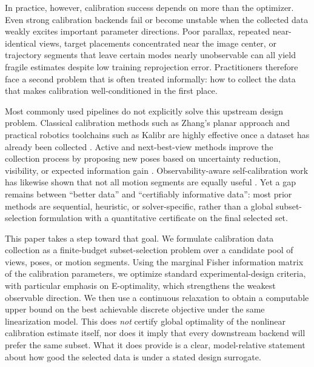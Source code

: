 \documentclass[11pt]{article}
\begin{document}
In practice, however, calibration success depends on more than the optimizer.
Even strong calibration backends fail or become unstable when the collected data
weakly excites important parameter directions. Poor parallax, repeated
near-identical views, target placements concentrated near the image center, or
trajectory segments that leave certain modes nearly unobservable can all yield
fragile estimates despite low training reprojection error. Practitioners
therefore face a second problem that is often treated informally: how to collect
the data that makes calibration well-conditioned in the first place.

Most commonly used pipelines do not explicitly solve this upstream design
problem. Classical calibration methods such as Zhang's planar approach and
practical robotics toolchains such as Kalibr are highly effective once a
dataset has already been collected
\citep{zhang2000flexible,furgale2013kalibr,kalibr_toolbox}. Active and
next-best-view methods improve the collection process by proposing new poses
based on uncertainty reduction, visibility, or expected information gain
\citep{richardson2013aprilcal,peng2019calibration,rojtberg2018efficient,yang2023nbv,wang2025active}.
Observability-aware self-calibration work has likewise shown that not all motion
segments are equally useful
\citep{maye2013self,schneider2017informative,schneider2019observability,yang2023online}.
Yet a gap remains between ``better data'' and ``certifiably informative data'':
most prior methods are sequential, heuristic, or solver-specific, rather than a
global subset-selection formulation with a quantitative certificate on the final
selected set.

This paper takes a step toward that goal. We formulate calibration data
collection as a finite-budget subset-selection problem over a candidate pool of
views, poses, or motion segments. Using the marginal Fisher information matrix
of the calibration parameters, we optimize standard experimental-design
criteria, with particular emphasis on E-optimality, which strengthens the
weakest observable direction. We then use a continuous relaxation to obtain a
computable upper bound on the best achievable discrete objective under the same
linearization model. This does \emph{not} certify global optimality of the
nonlinear calibration estimate itself, nor does it imply that every downstream
backend will prefer the same subset. What it does provide is a clear,
model-relative statement about how good the selected data is under a stated
design surrogate.
\end{document}
